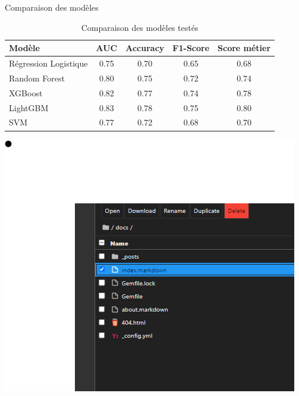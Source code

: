 \documentclass{beamer}
\begin{document}
\begin{frame}{Comparaison des modèles}
    \begin{table}[]
        \centering
        \caption{Comparaison des modèles testés}
        \begin{tabular}{@{}lcccc@{}}
        \toprule
        \textbf{Modèle} & \textbf{AUC} & \textbf{Accuracy} & \textbf{F1-Score} & \textbf{Score métier} \\ \midrule
        Régression Logistique & 0.75 & 0.70 & 0.65 & 0.68 \\
        Random Forest & 0.80 & 0.75 & 0.72 & 0.74 \\
        XGBoost & 0.82 & 0.77 & 0.74 & 0.78 \\
        LightGBM & 0.83 & 0.78 & 0.75 & 0.80 \\
        SVM & 0.77 & 0.72 & 0.68 & 0.70 \\ \bottomrule
        \end{tabular}
    \end{table}
    \includegraphics[width=\textwidth]{assets/test.png} %
\end{frame}
\end{document}
